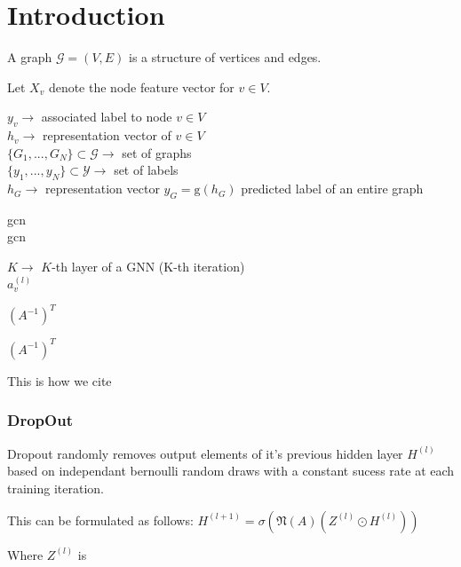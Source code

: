 % 

\chapter{Introduction}
\label{sec:intro}

A graph $\mathcal G = (V, E)$ is a structure of vertices and edges.

Let $ X_{v} $ denote the node feature vector for $v\in V$.


$y_{v}\rightarrow$ associated label to node $v\in V$\\
$h_{v}\rightarrow$ representation vector of $v\in V$\\


$\{G_{1},...,G_{N}\} \subset \mathcal{G} \rightarrow$ set of graphs\\
$\{y_{1},...,y_{N}\} \subset \mathcal{Y}\rightarrow$ set of labels\\

$h_{G}\rightarrow$ representation vector
$y_{G} = \mathrm{g}(h_{G})$ predicted label of an entire graph


\ac{gcn}\\
\ac{gcn}

$K \rightarrow$ $K$-th layer of a GNN (K-th iteration)\\
$a^{(l)}_{v}$


% 



$({A}^{-1})^{T}$

${({A}^{-1})}^{T}$


This is how we cite\\
\cite{DBLP:journals/corr/abs-2006-04064}



\subsection{DropOut}
\cite{Srivastava2014}

Dropout randomly removes output elements of it's previous hidden layer $H^{(l)}$
based on independant bernoulli random draws with a constant sucess rate at each training iteration.

This can be formulated as follows:
$H^{(l+1)} = \sigma(\mathfrak{N}(A)(Z^{(l)}\odot H^{(l)}))$

Where $Z^{(l)} $ is